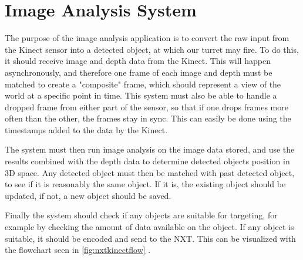 \section{Image Analysis System}

\label{image_analysis_design}

The purpose of the image analysis application is to convert the raw input from the Kinect sensor into a detected
object, at which our turret may fire. To do this, it should receive image and depth data from the Kinect.
This will happen asynchronously, and therefore one frame of each image and depth must be matched to create a
"composite" frame, which should represent a view of the world at a specific point in time. This system must
also be able to handle a dropped frame from either part of the sensor, so that if one drops frames more
often than the other, the frames stay in sync. This can easily be done using the timestamps added to the data
by the Kinect.

The system must then run image analysis on the image data stored, and use the results combined with the depth
data to determine detected objects position in 3D space. Any detected object must then be matched with past
detected object, to see if it is reasonably the same object. If it is, the existing object should be updated,
if not, a new object should be saved.

Finally the system should check if any objects are suitable for targeting, for example by checking the amount of
data available on the object. If any object is suitable, it should be encoded and send to the NXT.
This can be visualized with the flowchart seen in \autoref{fig:nxtkinectflow} .

